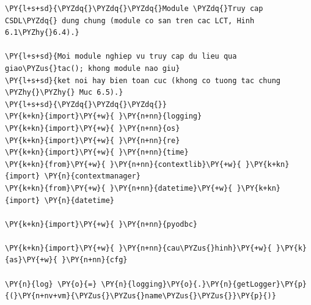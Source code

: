 \begin{Verbatim}[commandchars=\\\{\},frame=single,framerule=0.3pt,rulecolor=\color{black!40},fontsize=\footnotesize,breaklines=true]
\PY{l+s+sd}{\PYZdq{}\PYZdq{}\PYZdq{}Module \PYZdq{}Truy cap CSDL\PYZdq{} dung chung (module co san tren cac LCT, Hinh 6.1\PYZhy{}6.4).}

\PY{l+s+sd}{Moi module nghiep vu truy cap du lieu qua giao\PYZus{}tac(); khong module nao giu}
\PY{l+s+sd}{ket noi hay bien toan cuc (khong co tuong tac chung \PYZhy{}\PYZhy{} Muc 6.5).}
\PY{l+s+sd}{\PYZdq{}\PYZdq{}\PYZdq{}}
\PY{k+kn}{import}\PY{+w}{ }\PY{n+nn}{logging}
\PY{k+kn}{import}\PY{+w}{ }\PY{n+nn}{os}
\PY{k+kn}{import}\PY{+w}{ }\PY{n+nn}{re}
\PY{k+kn}{import}\PY{+w}{ }\PY{n+nn}{time}
\PY{k+kn}{from}\PY{+w}{ }\PY{n+nn}{contextlib}\PY{+w}{ }\PY{k+kn}{import} \PY{n}{contextmanager}
\PY{k+kn}{from}\PY{+w}{ }\PY{n+nn}{datetime}\PY{+w}{ }\PY{k+kn}{import} \PY{n}{datetime}

\PY{k+kn}{import}\PY{+w}{ }\PY{n+nn}{pyodbc}

\PY{k+kn}{import}\PY{+w}{ }\PY{n+nn}{cau\PYZus{}hinh}\PY{+w}{ }\PY{k}{as}\PY{+w}{ }\PY{n+nn}{cfg}

\PY{n}{log} \PY{o}{=} \PY{n}{logging}\PY{o}{.}\PY{n}{getLogger}\PY{p}{(}\PY{n+nv+vm}{\PYZus{}\PYZus{}name\PYZus{}\PYZus{}}\PY{p}{)}



\end{Verbatim}
